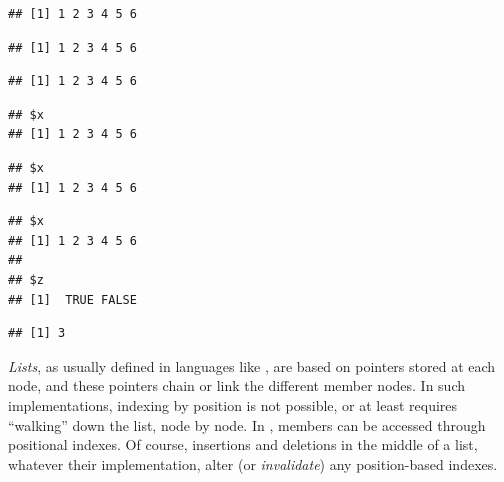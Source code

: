 \documentclass[krantz2]{krantz}\usepackage{knitr}
\begin{document}
\begin{knitrout}\footnotesize
{}\color{fgcolor}\begin{kframe}
\begin{alltt}
\hlopt{$}
\end{alltt}
\begin{verbatim}
## [1] 1 2 3 4 5 6
\end{verbatim}
\begin{alltt}
\hlstd{a.list[[}\hlstd{]]}
\end{alltt}
\begin{verbatim}
## [1] 1 2 3 4 5 6
\end{verbatim}
\begin{alltt}
\hlstd{a.list[[}\hlstd{]]}
\end{alltt}
\begin{verbatim}
## [1] 1 2 3 4 5 6
\end{verbatim}
\begin{alltt}
\hlstd{a.list[}\hlstd{]}
\end{alltt}
\begin{verbatim}
## $x
## [1] 1 2 3 4 5 6
\end{verbatim}
\begin{alltt}
\hlstd{a.list[}\hlstd{]}
\end{alltt}
\begin{verbatim}
## $x
## [1] 1 2 3 4 5 6
\end{verbatim}
\begin{alltt}
\hlstd{a.list[}\hlstd{(}\hlstd{,}\hlstd{)]}
\end{alltt}
\begin{verbatim}
## $x
## [1] 1 2 3 4 5 6
##
## $z
## [1]  TRUE FALSE
\end{verbatim}
\begin{alltt}
\hlstd{(a.list[[}\hlstd{(}\hlstd{,}\hlstd{)]])}
\end{alltt}
\begin{verbatim}
## [1] 3
\end{verbatim}
\end{kframe}
\end{knitrout}

\begin{explainbox}
\emph{Lists}, as usually defined in languages like \Clang, are based on pointers stored at each node, and these pointers chain or link the different member nodes. In such implementations, indexing by position is not possible, or at least requires ``walking'' down the list, node by node. In \Rlang,  members can be accessed through positional indexes. Of course, insertions and deletions in the middle of a list, whatever their implementation, alter (or \emph{invalidate}) any position-based indexes.
\end{explainbox}
\end{document}
